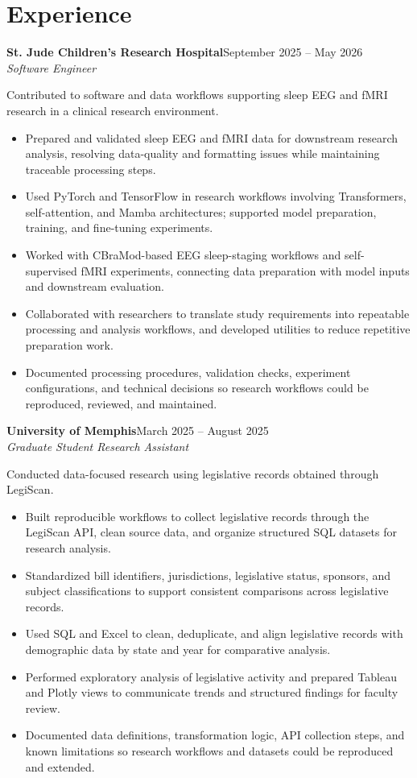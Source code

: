 \documentclass[11pt,letterpaper]{article}
\newcommand{\entry}[3]{\needspace{11\baselineskip}\noindent\textbf{#1}\hfill #3\\[-1pt]\textit{#2}\par}
\begin{document}
\section*{Experience}
\entry{St. Jude Children's Research Hospital}{Software Engineer}{September 2025 -- May 2026}
Contributed to software and data workflows supporting sleep EEG and fMRI research in a clinical research environment.
\begin{itemize}
\item Prepared and validated sleep EEG and fMRI data for downstream research analysis, resolving data-quality and formatting issues while maintaining traceable processing steps.
\item Used PyTorch and TensorFlow in research workflows involving Transformers, self-attention, and Mamba architectures; supported model preparation, training, and fine-tuning experiments.
\item Worked with CBraMod-based EEG sleep-staging workflows and self-supervised fMRI experiments, connecting data preparation with model inputs and downstream evaluation.
\item Collaborated with researchers to translate study requirements into repeatable processing and analysis workflows, and developed utilities to reduce repetitive preparation work.
\item Documented processing procedures, validation checks, experiment configurations, and technical decisions so research workflows could be reproduced, reviewed, and maintained.
\end{itemize}\vspace{2pt}
\entry{University of Memphis}{Graduate Student Research Assistant}{March 2025 -- August 2025}
Conducted data-focused research using legislative records obtained through LegiScan.
\begin{itemize}
\item Built reproducible workflows to collect legislative records through the LegiScan API, clean source data, and organize structured SQL datasets for research analysis.
\item Standardized bill identifiers, jurisdictions, legislative status, sponsors, and subject classifications to support consistent comparisons across legislative records.
\item Used SQL and Excel to clean, deduplicate, and align legislative records with demographic data by state and year for comparative analysis.
\item Performed exploratory analysis of legislative activity and prepared Tableau and Plotly views to communicate trends and structured findings for faculty review.
\item Documented data definitions, transformation logic, API collection steps, and known limitations so research workflows and datasets could be reproduced and extended.
\end{itemize}\vspace{2pt}
\end{document}
